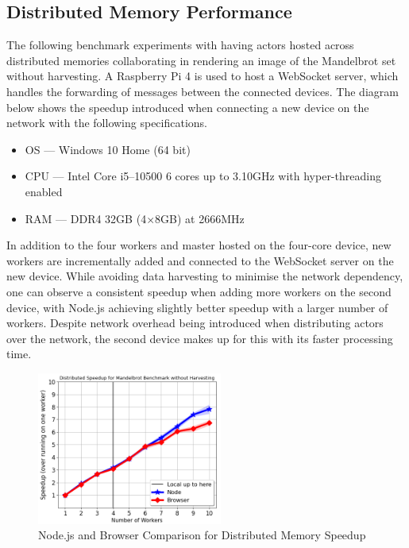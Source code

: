 \documentclass[lettersize,journal]{IEEEtran}
\begin{document}
\subsection{Distributed Memory Performance}
The following benchmark experiments with having actors hosted across distributed memories collaborating in rendering an image of the Mandelbrot set~\cite{mandelbrot} without harvesting. A Raspberry Pi 4 is used to host a WebSocket server, which handles the forwarding of messages between the connected devices. The diagram below shows the speedup introduced when connecting a new device on the network with the following specifications.
\begin{itemize}
    \item OS --- Windows 10 Home (64 bit)
    \item CPU --- Intel Core i5--10500 6 cores up to 3.10GHz with hyper-threading enabled
    \item RAM --- DDR4 32GB (4$\times$8GB) at 2666MHz
\end{itemize}
In addition to the four workers and master hosted on the four-core device, new workers are incrementally added and connected to the WebSocket server on the new device. While avoiding data harvesting to minimise the network dependency, one can observe a consistent speedup when adding more workers on the second device, with Node.js achieving slightly better speedup with a larger number of workers. Despite network overhead being introduced when distributing actors over the network, the second device makes up for this with its faster processing time.
\begin{figure}[H]
    \begin{centering}
        \includegraphics[width=230px]{resources/distributed_memory_speedup.png}
        \caption{Node.js and Browser Comparison for Distributed Memory Speedup}
    \end{centering}
\end{figure}
\end{document}

